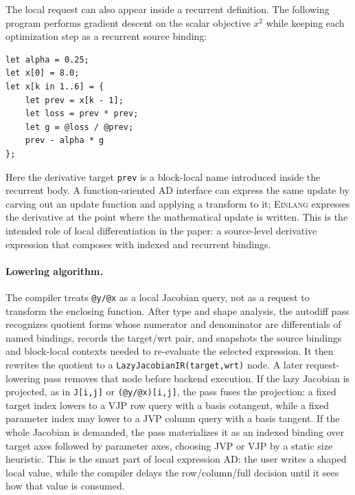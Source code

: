 \documentclass[sigplan,screen,nonacm]{acmart}
\newcommand{\einlang}{\textsc{Einlang}}
\begin{document}
The local request can also appear inside a recurrent definition. The following program performs gradient descent on the scalar objective $x^2$ while keeping each optimization step as a recurrent source binding:
\begin{lstlisting}[style=einlang]
let alpha = 0.25;
let x[0] = 8.0;
let x[k in 1..6] = {
    let prev = x[k - 1];
    let loss = prev * prev;
    let g = @loss / @prev;
    prev - alpha * g
};
\end{lstlisting}
Here the derivative target \texttt{prev} is a block-local name introduced inside the recurrent body. A function-oriented AD interface can express the same update by carving out an update function and applying a transform to it; \einlang{} expresses the derivative at the point where the mathematical update is written. This is the intended role of local differentiation in the paper: a source-level derivative expression that composes with indexed and recurrent bindings.

\paragraph{Lowering algorithm.}
The compiler treats \texttt{@y/@x} as a local Jacobian query, not as a request to transform the enclosing function. After type and shape analysis, the autodiff pass recognizes quotient forms whose numerator and denominator are differentials of named bindings, records the target/wrt pair, and snapshots the source bindings and block-local contexts needed to re-evaluate the selected expression. It then rewrites the quotient to a \texttt{LazyJacobianIR(target,wrt)} node. A later request-lowering pass removes that node before backend execution. If the lazy Jacobian is projected, as in \texttt{J[i,j]} or \texttt{(@y/@x)[i,j]}, the pass fuses the projection: a fixed target index lowers to a VJP row query with a basis cotangent, while a fixed parameter index may lower to a JVP column query with a basis tangent. If the whole Jacobian is demanded, the pass materializes it as an indexed binding over target axes followed by parameter axes, choosing JVP or VJP by a static size heuristic. This is the smart part of local expression AD: the user writes a shaped local value, while the compiler delays the row/column/full decision until it sees how that value is consumed.
\end{document}
